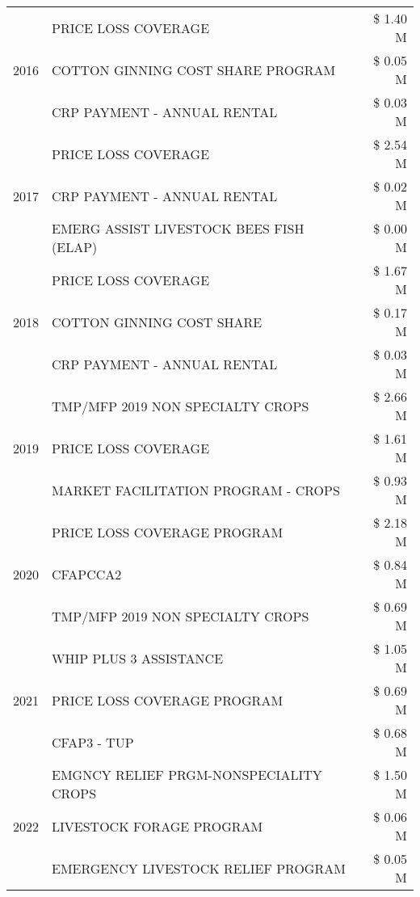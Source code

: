 \begin{tabular}{llr}
\cline{1-3}
\multirow[t]{3}{*}{2016} & PRICE LOSS COVERAGE & \$ 1.40 M \\
 & COTTON GINNING COST SHARE PROGRAM & \$ 0.05 M \\
 & CRP PAYMENT - ANNUAL RENTAL & \$ 0.03 M \\
\cline{1-3}
\multirow[t]{3}{*}{2017} & PRICE LOSS COVERAGE & \$ 2.54 M \\
 & CRP PAYMENT - ANNUAL RENTAL & \$ 0.02 M \\
 & EMERG ASSIST LIVESTOCK BEES FISH (ELAP) & \$ 0.00 M \\
\cline{1-3}
\multirow[t]{3}{*}{2018} & PRICE LOSS COVERAGE & \$ 1.67 M \\
 & COTTON GINNING COST SHARE & \$ 0.17 M \\
 & CRP PAYMENT - ANNUAL RENTAL & \$ 0.03 M \\
\cline{1-3}
\multirow[t]{3}{*}{2019} & TMP/MFP 2019 NON SPECIALTY CROPS & \$ 2.66 M \\
 & PRICE LOSS COVERAGE & \$ 1.61 M \\
 & MARKET FACILITATION PROGRAM - CROPS & \$ 0.93 M \\
\cline{1-3}
\multirow[t]{3}{*}{2020} & PRICE LOSS COVERAGE PROGRAM & \$ 2.18 M \\
 & CFAPCCA2 & \$ 0.84 M \\
 & TMP/MFP 2019 NON SPECIALTY CROPS & \$ 0.69 M \\
\cline{1-3}
\multirow[t]{3}{*}{2021} & WHIP PLUS 3 ASSISTANCE & \$ 1.05 M \\
 & PRICE LOSS COVERAGE PROGRAM & \$ 0.69 M \\
 & CFAP3 - TUP & \$ 0.68 M \\
\cline{1-3}
\multirow[t]{3}{*}{2022} & EMGNCY RELIEF PRGM-NONSPECIALITY CROPS & \$ 1.50 M \\
 & LIVESTOCK FORAGE PROGRAM & \$ 0.06 M \\
 & EMERGENCY LIVESTOCK RELIEF PROGRAM & \$ 0.05 M \\
\cline{1-3}
\bottomrule
\end{tabular}
